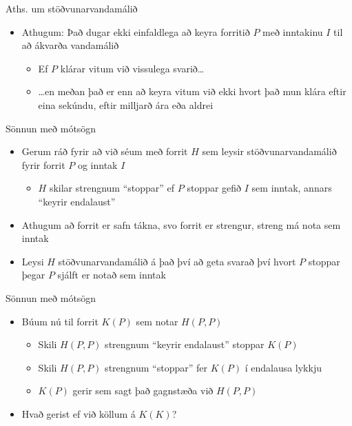 \documentclass{beamer}
\begin{document}
\begin{frame}{Aths. um stöðvunarvandamálið}
\begin{itemize}
 \item Athugum: Það dugar ekki einfaldlega að keyra forritið $P$ með inntakinu $I$ til að ákvarða vandamálið
 \begin{itemize}
  \item Ef $P$ klárar vitum við vissulega svarið\ldots
  \item \ldots en meðan það er enn að keyra vitum við ekki hvort það mun klára eftir eina sekúndu, eftir milljarð ára eða aldrei
 \end{itemize}
\end{itemize}
\end{frame}

\begin{frame}{Sönnun með mótsögn}
\begin{itemize}
 \item Gerum ráð fyrir að við séum með forrit $H$ sem leysir stöðvunarvandamálið fyrir forrit $P$ og inntak $I$
 \begin{itemize}
  \item $H$ skilar strengnum ``stoppar'' ef $P$ stoppar gefið $I$ sem inntak, annars ``keyrir endalaust'' \pause
 \end{itemize}
 \item Athugum að forrit er safn tákna, svo forrit er strengur, streng má nota sem inntak
 \item Leysi $H$ stöðvunarvandamálið á það því að geta svarað því hvort $P$ stoppar þegar $P$ sjálft er notað sem inntak
\end{itemize}
\end{frame}

\begin{frame}{Sönnun með mótsögn}
\begin{itemize}
 \item Búum nú til forrit $K(P)$ sem notar $H(P, P)$
 \begin{itemize}
  \item Skili $H(P, P)$ strengnum ``keyrir endalaust'' stoppar $K(P)$ 
  \item Skili $H(P, P)$ strengnum ``stoppar'' fer $K(P)$ í endalausa lykkju
  \item $K(P)$ gerir sem sagt það gagnstæða við $H(P, P)$
 \end{itemize}
 \item Hvað gerist ef við köllum á $K(K)$?
\end{itemize}
\end{frame}
\end{document}
